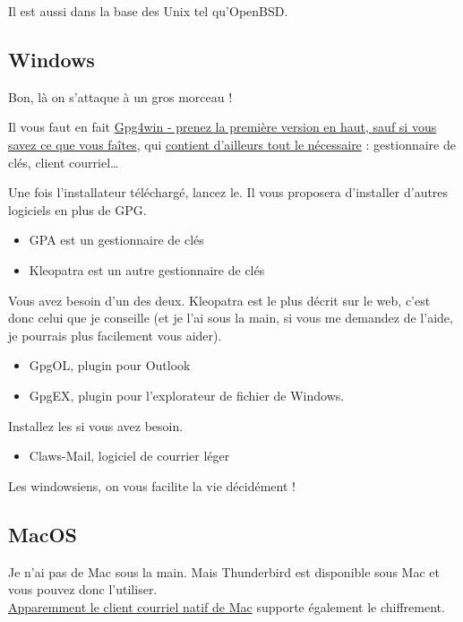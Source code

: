 Il est aussi dans la base des Unix tel qu'OpenBSD.

\subsection{Windows}\label{windows}

Bon, là on s'attaque à un gros morceau !

Il vous faut en fait \href{http://www.gpg4win.org/download.html}{Gpg4win
- prenez la première version en haut, sauf si vous savez ce que vous
faîtes}, qui \href{http://www.gpg4win.org/about.html}{contient
d'ailleurs tout le nécessaire} : gestionnaire de clés, client
courriel\ldots{}

Une fois l'installateur téléchargé, lancez le. Il vous proposera
d'installer d'autres logiciels en plus de GPG.

\begin{itemize}
\itemsep1pt\parskip0pt
\item
  GPA est un gestionnaire de clés
\item
  Kleopatra est un autre gestionnaire de clés
\end{itemize}

Vous avez besoin d'un des deux. Kleopatra est le plus décrit sur le web,
c'est donc celui que je conseille (et je l'ai sous la main, si vous me
demandez de l'aide, je pourrais plus facilement vous aider).

\begin{itemize}
\itemsep1pt\parskip0pt
\item
  GpgOL, plugin pour Outlook
\item
  GpgEX, plugin pour l'explorateur de fichier de Windows.
\end{itemize}

Installez les si vous avez besoin.

\begin{itemize}
\itemsep1pt\parskip0pt
\item
  Claws-Mail, logiciel de courrier léger
\end{itemize}

Les windowsiens, on vous facilite la vie décidément !

\subsection{MacOS}\label{macos}

Je n'ai pas de Mac sous la main. Mais Thunderbird est disponible sous
Mac et vous pouvez donc
l'utiliser.\\\href{http://www.gbronner.net/mail/GPGMacOSX.html}{Apparemment
le client courriel natif de Mac} supporte également le chiffrement.


